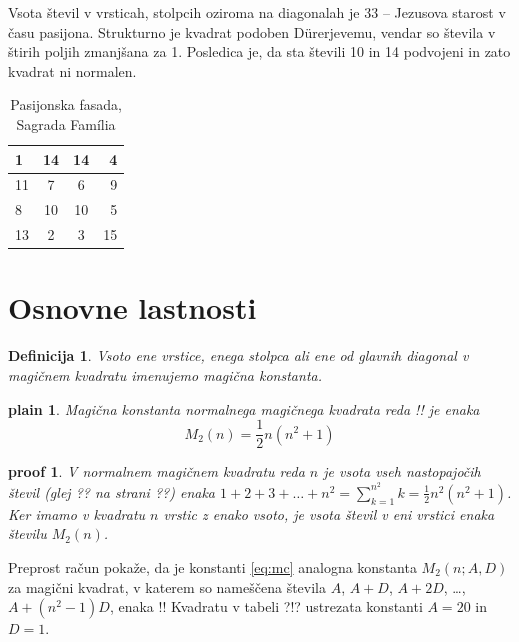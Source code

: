 \documentclass[a4paper,12pt]{article}
\newtheorem{definicija}{Definicija}
\newtheorem{izrek}{plain}
\newtheorem{dokaz}{proof}
\begin{document}
Vsota števil v vrsticah, stolpcih oziroma na diagonalah je 33 -- Jezusova starost
v času pasijona. Strukturno je kvadrat podoben Dürerjevemu, vendar so števila
v štirih poljih zmanjšana za 1. Posledica je, da sta števili 10 in 14 podvojeni
in zato kvadrat ni normalen.

\begin {table}[h!]
   \begin{center}
      \caption{Pasijonska fasada, Sagrada Família}
      \label{table:sagrada}
      \begin{tabular}{l | c | c | r}
         1 & 14 & 14 &  4 \\\hline
         11 &  7 &  6 &  9 \\\hline
         8 & 10 & 10 &  5 \\\hline
         13 &  2 &  3 & 15 \\\hline
      \end{tabular}
   \end{center}
\end{table}

\section{Osnovne lastnosti}

\begin{definicija}
      Vsoto ene vrstice, enega stolpca ali ene od glavnih diagonal
      v magičnem kvadratu imenujemo \emph{magična konstanta}.
\end{definicija}

\begin{izrek}
   Magična konstanta normalnega magičnega kvadrata reda !!
   je enaka
   \begin{equation}
      \label{eq:mc}
      M_2(n) = \frac{1}{2} n(n^2+1)
   \end{equation}
\end{izrek}

\begin{dokaz}
   V normalnem magičnem kvadratu reda $n$ je vsota vseh nastopajočih
   števil (glej ?? na strani ??) enaka
   $1+2+3+\dots+n^2=\sum_{k=1}^{n^2}k=\frac{1}{2}n^2(n^2+1)$. Ker imamo
   v kvadratu $n$ vrstic z enako vsoto, je vsota števil v eni vrstici
   enaka številu $M_2(n)$. %
\end{dokaz}

Preprost račun pokaže, da je konstanti \eqref{eq:mc} analogna konstanta
$M_2(n;A,D)$ za magični kvadrat, v katerem so nameščena števila
$A$, $A+D$, $A+2D$, \dots, $A+(n^2-1)D$, enaka %
!!
Kvadratu v tabeli ?!? ustrezata konstanti $A=20$ in $D=1$.
\end{document}
